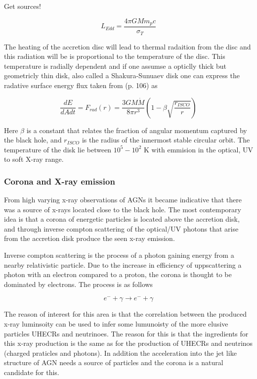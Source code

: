 \documentclass{article}
\begin{document}
Get sources!

\begin{equation}
    L_{Edd} = \frac{4\pi G M m_p c}{\sigma_T}
    \label{eq:eddington_luminosity}
\end{equation}

The heating of the accretion disc will lead to thermal radaition from the disc and this radiation will be
is proportional to the temperature of the disc. This temperature is radially dependent and if one assumse a opticlly thick but geometricly thin disk, also called a Shakura-Sunuaev disk
one can express the radative surface energy flux taken from \cite{BHradiation}(p. 106) as 

\begin{equation}
    \frac{dE}{dAdt}= F_{rad}(r) = \frac{3GM\dot{M}}{8\pi r^3}\left(1-\beta\sqrt{\frac{r_{ISCO}}{r}}\right)
\end{equation}

Here $\beta$ is a constant that relates the fraction of angular momentum captured by the black hole, and $r_{ISCO}$ is the radius of the innermost stable circular orbit. 
The temperature of the disk lie between $10^5 - 10^2$ K with emmision in the optical, UV to soft X-ray range. \cite{scholarpedia_accretion_discs}


\subsubsection{Corona and X-ray emission}
From high varying x-ray observations of AGNs it became indicative that there was a source of x-rays located close to the black hole. 
The most contemporary idea is that a corona of energetic particles is located above the accretion disk, and through inverse compton scattering
of the optical/UV photons that arise from the accretion disk produce the seen x-ray emission. 

Inverse compton scattering is the process of a photon gaining energy from a nearby relativistic particle. Due to the increase in efficiency 
of uppscattering a photon with an electron compared to a proton, the corona is thought to be dominated by electrons. The process is as follows

\begin{equation}
    e^- + \gamma \rightarrow e^- + \gamma 
\end{equation}

The reason of interest for this area is that the correlation between the produced x-ray luminsoity can be used to infer some lumunoisty of the more elusive 
particles UHECRs and neutrinoes. The reason for this is that the ingredients for this x-ray production is the same as for the production of UHECRs and neutrinos (charged praticles and photons). In addition 
the acceleration into the jet like structure of AGN needs a source of particles and the corona is a natural candidate for this.
\end{document}
